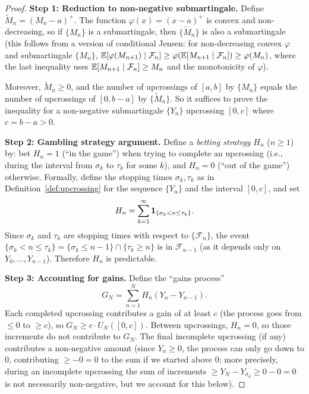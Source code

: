 \documentclass[11pt,a4paper]{article}
\begin{document}
\begin{proof}
\textbf{Step 1: Reduction to non-negative submartingale.}
Define $\tilde{M}_n = (M_n - a)^+$.  The function
$\varphi(x) = (x - a)^+$ is convex and non-decreasing, so if
$\{M_n\}$ is a submartingale, then $\{\tilde{M}_n\}$ is also a
submartingale (this follows from a version of conditional Jensen:
for non-decreasing convex $\varphi$ and submartingale $\{M_n\}$,
$\mathbb{E}[\varphi(M_{n+1}) \mid \mathcal{F}_n] \geq
\varphi(\mathbb{E}[M_{n+1} \mid \mathcal{F}_n]) \geq \varphi(M_n)$,
where the last inequality uses $\mathbb{E}[M_{n+1} \mid \mathcal{F}_n]
\geq M_n$ and the monotonicity of $\varphi$).

Moreover, $\tilde{M}_n \geq 0$, and the number of upcrossings of
$[a, b]$ by $\{M_n\}$ equals the number of upcrossings of
$[0, b-a]$ by $\{\tilde{M}_n\}$.  So it suffices to prove the
inequality for a non-negative submartingale $\{Y_n\}$ upcrossing
$[0, c]$ where $c = b - a > 0$.

\textbf{Step 2: Gambling strategy argument.}
Define a \emph{betting strategy} $H_n$ ($n \geq 1$) by: bet
$H_n = 1$ (``in the game'') when trying to complete an
upcrossing (i.e., during the interval from $\sigma_k$ to
$\tau_k$ for some $k$), and $H_n = 0$ (``out of the game'')
otherwise.  Formally, define the stopping times
$\sigma_k, \tau_k$ as in
Definition~\ref{def:upcrossing} for the sequence $\{Y_n\}$ and
the interval $[0, c]$, and set
\begin{equation}
  H_n = \sum_{k=1}^\infty
    \mathbf{1}_{\{\sigma_k < n \leq \tau_k\}}.
  \label{eq:betting_strategy}
\end{equation}
Since $\sigma_k$ and $\tau_k$ are stopping times with respect to
$\{\mathcal{F}_n\}$, the event
$\{\sigma_k < n \leq \tau_k\}
= \{\sigma_k \leq n-1\} \cap \{\tau_k \geq n\}$
is in $\mathcal{F}_{n-1}$ (as it depends only on
$Y_0, \ldots, Y_{n-1}$).  Therefore $H_n$ is predictable.

\textbf{Step 3: Accounting for gains.}
Define the ``gains process''
\begin{equation}
  G_N = \sum_{n=1}^N H_n (Y_n - Y_{n-1}).
  \label{eq:gains}
\end{equation}
Each completed upcrossing contributes a gain of at least $c$
(the process goes from $\leq 0$ to $\geq c$), so
$G_N \geq c \cdot U_N([0,c])$.  Between upcrossings, $H_n = 0$,
so those increments do not contribute to $G_N$.  The final
incomplete upcrossing (if any) contributes a non-negative amount
(since $Y_n \geq 0$, the process can only go down to $0$,
contributing $\geq -0 = 0$ to the sum if we started above $0$;
more precisely, during an incomplete upcrossing the sum of
increments $\geq Y_N - Y_{\sigma_k} \geq 0 - 0 = 0$ is not
necessarily non-negative, but we account for this below).


\end{proof}
\end{document}
